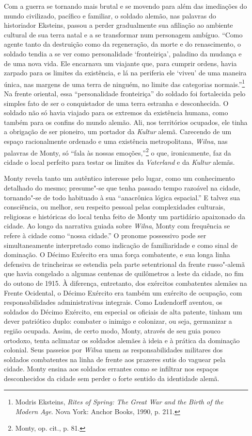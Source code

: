 Com a guerra se tornando mais brutal e se movendo para além das
imediações do mundo civilizado, pacífico e familiar, o soldado alemão,
nas palavras do historiador Eksteins, passou a perder gradualmente sua
afiliação ao ambiente cultural de sua terra natal e a se transformar num
personagem ambíguo. ``Como agente tanto da destruição como da
regeneração, da morte e do renascimento, o soldado tendia a se ver como
personalidade `fronteiriça', paladino da mudança e de uma nova vida. Ele
encarnava um viajante que, para cumprir ordens, havia zarpado para os
limites da existência, e lá na periferia ele `viveu' de uma maneira
única, nas margens de uma terra de ninguém, no limite das categorias
normais.''\footnote{Modris Eksteins, \textit{Rites of Spring: The Great War and the Birth of the Modern Age}. Nova York: Anchor Books, 1990, p. 211.} Na frente oriental, essa ``personalidade fronteiriça'' do soldado foi fortalecida pelo simples fato de ser o conquistador de uma
terra estranha e desconhecida. O soldado não só havia viajado para os
extremos da existência humana, como também para os confins do mundo
alemão. Ali, nos territórios ocupados, ele tinha a obrigação de ser
pioneiro, um portador da \textit{Kultur} alemã. Carecendo de um espaço
racionalmente ordenado e uma existência metropolitana, \textit{Wilna}, nas
palavras de Monty, só ``fala às nossas emoções,''\footnote{Monty, op. cit., p. 81.} o que, ironicamente, faz da cidade o local perfeito para testar os limites da \textit{Vaterland} e da \textit{Kultur} alemãs.

Monty revela tanto um autêntico interesse pelo lugar, como um
conhecimento detalhado do mesmo; presume"-se que tenha passado tempo
razoável na cidade, tornando"-se de todo habituado à sua ``anacrônica
lógica espacial.'' E talvez sua consciência, ou melhor, seu respeito
pessoal pelas complexidades culturais, religiosas e históricas do local
tenha feito de Monty um partidário apaixonado da cidade. Ao longo da
narrativa guiada sobre \textit{Wilna}, Monty com frequência se refere à cidade
como ``nossa cidade.'' O pronome possessivo pode ser simultaneamente
interpretado como indicação de familiaridade e como sinal de dominação.
O Décimo Exército era uma força combatente, e sua longa linha defensiva
de trincheiras se estendia pela parte setentrional da frente russo"-alemã
que havia congelado a algumas centenas de quilômetros a leste da cidade,
no fim do outono de 1915. À diferença, entretanto, dos exércitos
combatentes alemães na Frente Ocidental, o Décimo Exército era também um
exército de ocupação, com responsabilidades administrativas integrais.
Como Ludendorff aventou, os soldados do Décimo Exército, em especial os
oficiais de alta patente, tinham um dever patriótico duplo: combater o
inimigo e colonizar, ou seja, germanizar a região ocupada. Assim, de
certo modo, Monty, através de seu guia pouco ortodoxo, tenta aclimatar
os soldados alemães à ideia e à prática da dominação colonial. Seus
passeios por \textit{Wilna} unem as responsabilidades militares dos soldados
combatentes na linha de frente aos prazeres sutis do vaguear pela
cidade. Monty ensina aos soldados errantes como se infiltrar nos espaços
desconhecidos da cidade sem perder o forte sentido da identidade alemã.

